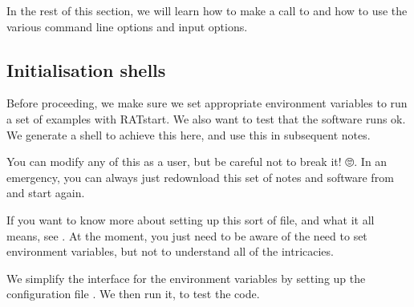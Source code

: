 \documentclass[letterpaper,10pt,english]{sphinxmanual}
\begin{document}
In the rest of this section, we will learn how to make a call to  and how to use the various command line options and input options.


\subsection{Initialisation shells}
\label{\detokenize{RATstart:Initialisation-shells}}
Before proceeding, we make sure we set appropriate environment variables to run a set of examples with RATstart. We also want to test that the software runs ok. We generate a  shell to achieve this here, and use this in subsequent notes.

You can modify any of this as a user, but be careful not to break it! 🙄. In an emergency, you can always just re\sphinxhyphen{}download this set of notes and software from  and start again.

If you want to know more about setting up this sort of file, and what it all means, see . At the moment, you just need to be aware of the need to set environment variables, but not to understand all of the intricacies.

We simplify the interface for the environment variables by setting up the configuration file . We then run it, to test the code.
\end{document}
